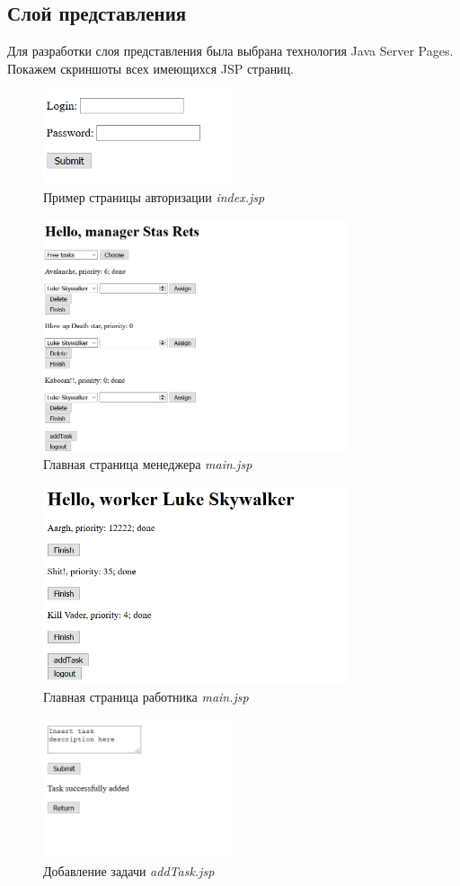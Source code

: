 \subsection{Слой представления}
Для разработки слоя представления была выбрана технология Java Server Pages.
Покажем скриншоты всех имеющихся JSP страниц.
	\begin{figure}[H]
		\centering
		\includegraphics[width=0.5\textwidth]{../materials/Logon.png}
		\caption{Пример страницы авторизации \textit{index.jsp}}
		\label{fig:logon}
	\end{figure}
	\begin{figure}[H]
		\centering
		\includegraphics[width=0.8\textwidth]{../materials/Manager.png}
		\caption{Главная страница менеджера \textit{main.jsp}}
		\label{fig:manager}
	\end{figure}
	\begin{figure}[H]
		\centering
		\includegraphics[width=0.8\textwidth]{../materials/Worker.png}
		\caption{Главная страница работника \textit{main.jsp}}
		\label{fig:worker}
	\end{figure}
	\begin{figure}[H]
	\centering
	\includegraphics[width=0.5\textwidth]{../materials/addTask.png}
	\caption{Добавление задачи \textit{addTask.jsp}}
	\label{fig:addTask}
	\end{figure}